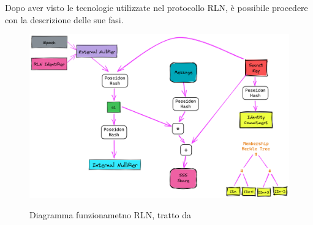 Dopo aver visto le tecnologie utilizzate nel protocollo RLN, è possibile procedere con la descrizione delle sue fasi.
\begin{figure}[H]
    \centering
    \includegraphics[width=13cm]{./chapters/2.rln-protocol/images/5.rln_flow.png}
    \label{fig:rln_flow}
    \captionsetup{justification=centering}
    \caption{Diagramma funzionametno RLN, tratto da \cite{rln_doc}}
\end{figure}




